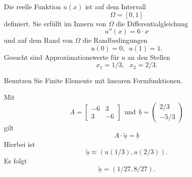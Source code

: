Die reelle Funktion $u(x)$ ist auf dem Intervall
\[
\Omega = [0, 1]
\]
definiert. Sie erfüllt im Innern von $\Omega$ die Differentialgleichung 
\[
u''(x) = 6 \cdot x
\]
und auf dem Rand von $\Omega$ die Randbedingungen 
\[
u(0) = 0, \ \ u(1) = 1.
\]
Gesucht sind Approximationswerte für $u$ an den Stellen
\[
x_1 = 1/3, \ \ \  x_2 = 2/3.
\]

Benutzen Sie Finite Elemente mit linearen Formfunktionen.

\begin{loesung}
Mit
\[
A = \left[\begin{array}{rr} -6 & 3 \\ 3 & -6  \end{array}\right] \ \ \mbox{und} \ \
  \underline{b} =  \left(\begin{array}{r} 2/3 \\ -5/3 \end{array}\right)
\]
gilt  
\[
A \cdot \underline{\tilde u} = \underline{b}
\]
Hierbei ist
\[
\underline{\tilde u} \approx (u(1/3), u(2/3)).
\]
Es folgt 
\[
\underline{\tilde u} = (1/27, 8/27).
\]
\end{loesung}

